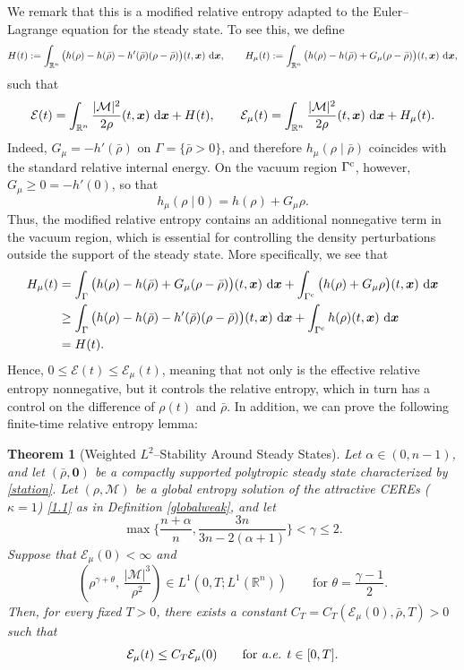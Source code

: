\documentclass[reqno,11pt]{amsart}
\numberwithin{equation}{section}
\newtheorem{theorem}{Theorem}[section]
\theoremstyle{definition}
\def\dd{{\, \rm d}}
\begin{document}
We remark that this is a modified relative entropy adapted to the
Euler--Lagrange equation for the steady state. To see this, we define
\[
    H(t) := \int_{\mathbb R^n}\big( h(\rho)-h(\bar\rho)-h'(\bar\rho)(\rho-\bar\rho)\big)(t,\boldsymbol{x})\,\dd\boldsymbol{x}, \qquad  H_\mu(t) := \int_{\mathbb R^n}\big( h(\rho)-h(\bar\rho)+G_\mu(\rho-\bar\rho)\big)(t,\boldsymbol{x})\,\dd\boldsymbol{x},
\]
such that
\[
    \mathcal{E}(t) = \int_{\mathbb R^n} \frac{|\mathcal M|^2}{2\rho}(t,\boldsymbol{x})\,\dd\boldsymbol{x} + H(t), \qquad \mathcal{E}_\mu(t) = \int_{\mathbb R^n} \frac{|\mathcal M|^2}{2\rho}(t,\boldsymbol{x})\,\dd\boldsymbol{x} + H_\mu(t).
\]
Indeed,  $G_\mu=-h'(\bar\rho)$ on $\Gamma=\{\bar\rho>0\}$, and therefore
$h_\mu(\rho\mid\bar\rho)$ coincides with the standard relative
internal energy.  On the vacuum region $\Gamma^{\rm c}$, however,
$G_\mu\ge0=-h'(0)$, so that
\[
 h_\mu(\rho\mid0)=h(\rho)+G_\mu\rho .
\]
Thus, the modified relative entropy contains an additional nonnegative
term in the vacuum region, which is essential for controlling the density
perturbations outside the support of the steady state. More specifically, we see that
\begin{align*}
    H_\mu(t) & = \int_{\Gamma}\big( h(\rho)-h(\bar\rho)+G_\mu(\rho-\bar\rho)\big)(t,\boldsymbol{x})\,\dd\boldsymbol{x} + \int_{\Gamma^{\rm c}}\big( h(\rho)+G_\mu\rho\big)(t,\boldsymbol{x})\,\dd\boldsymbol{x} \\
    & \geq \int_{\Gamma}\big( h(\rho)-h(\bar\rho)-h'(\bar\rho)(\rho-\bar\rho)\big)(t,\boldsymbol{x})\,\dd\boldsymbol{x} + \int_{\Gamma^{\rm c}} h(\rho)(t,\boldsymbol{x})\,\dd\boldsymbol{x} \\
    & = H(t).
\end{align*}
Hence, $0 \leq \mathcal{E}(t) \leq \mathcal{E}_\mu(t)$, meaning that not only is the effective relative entropy nonnegative, but it controls the relative entropy, which in turn has a control on the difference of $\rho(t)$ and $\bar\rho$. In addition, we can prove the following finite-time relative entropy lemma:

\begin{theorem}[Weighted $L^2$--Stability Around Steady States]\label{thm:stability}
Let $\alpha\in(0,n-1)$, and let $(\bar\rho,\boldsymbol{0})$ be a compactly supported polytropic steady state characterized by \eqref{station}.
Let $(\rho,\mathcal M)$ be a global entropy solution of 
the attractive CEREs {\rm(}$\kappa=1${\rm)} \eqref{1.1} as in
{\rm Definition \ref{globalweak}}, and let
\[
\max \Big\{\frac{n + \alpha}{n},\frac{3n}{3n - 2(\alpha + 1)} \Big\}<\gamma\le2.
\]
Suppose that $\mathcal E_\mu(0)<\infty$ and
\[
(\rho^{\gamma + \theta}, \,\frac{|\mathcal{M}|^{3}}{\rho^{2}})
\in L^1(0,T;L^1(\mathbb{R}^n))
\qquad \mbox{for $\theta = \frac{\gamma - 1}{2}$}.
\]
Then, for every fixed $T>0$, there exists a constant
$C_T=C_T(\mathcal E_\mu(0),\bar{\rho},T)>0$ such that
\begin{equation}\label{finitetimerelative}
 \mathcal E_\mu(t)
 \le C_T\mathcal E_\mu(0)
 \qquad \hbox{for {\it a.e.} }t\in[0,T].
\end{equation}
\end{theorem}
\end{document}
